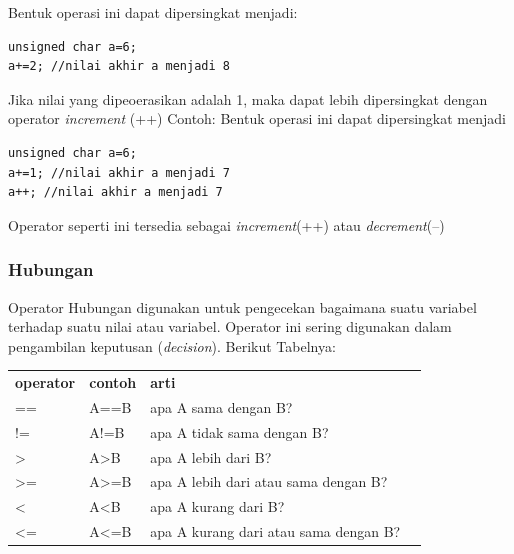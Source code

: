 \documentclass[12pt,]{article}
\begin{document}
	Bentuk operasi ini dapat dipersingkat menjadi:
	\begin{verbatim}
unsigned char a=6;
a+=2; //nilai akhir a menjadi 8
	\end{verbatim}
	
	Jika nilai yang dipeoerasikan adalah 1, maka dapat lebih dipersingkat dengan operator \textit{increment} (++)
	Contoh:
	Bentuk operasi ini dapat dipersingkat menjadi
	\begin{verbatim}
unsigned char a=6;
a+=1; //nilai akhir a menjadi 7
a++; //nilai akhir a menjadi 7
	\end{verbatim}
	
	Operator seperti ini tersedia sebagai \textit{increment}(++) atau \textit{decrement}(--)
	
	\subsubsection{Hubungan}
	
	Operator Hubungan digunakan untuk pengecekan bagaimana suatu variabel terhadap suatu nilai atau variabel.
	Operator ini sering digunakan dalam pengambilan keputusan (\textit{decision}).
	Berikut Tabelnya:
	\begin{table}[H]
		\begin{tabular}{|l|l|l|l}
			\cline{1-3}
			\textbf{operator} & \textbf{contoh} & \textbf{arti} \\ \cline{1-3}
			==                & A==B            & apa A sama dengan B? \\ \cline{1-3}
			!=                & A!=B            & apa A tidak sama dengan B? \\ \cline{1-3}
			>                 & A>B             & apa A lebih dari B?  \\ \cline{1-3}
			>=                & A>=B            & apa A lebih dari atau sama dengan B?\\ \cline{1-3}
			<                 & A<B             & apa A kurang dari B? \\ \cline{1-3}
			<=                & A<=B            & apa A kurang dari atau sama dengan B? \\ \cline{1-3}
		\end{tabular}
	\end{table}
\end{document}

